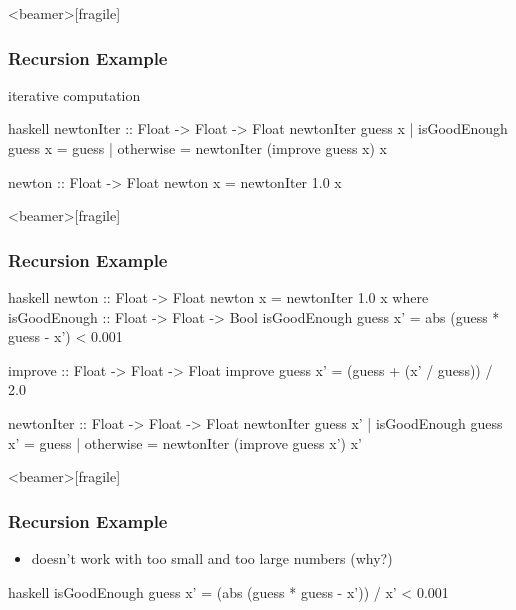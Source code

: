 \documentclass[dvipsnames]{beamer}
\theoremstyle{plain}
\begin{document}
\begin{frame}<beamer>[fragile]
  \frametitle{Recursion Example}

  \begin{exampleblock}{iterative computation}
    \begin{pygments}{haskell}
newtonIter :: Float -> Float -> Float
newtonIter guess x
  | isGoodEnough guess x = guess
  | otherwise            =
        newtonIter (improve guess x) x

newton :: Float -> Float
newton x = newtonIter 1.0 x
    \end{pygments}
  \end{exampleblock}
\end{frame}

\begin{frame}<beamer>[fragile]
  \frametitle{Recursion Example}

  \begin{exampleblock}{}
    \begin{pygments}{haskell}
newton :: Float -> Float
newton x = newtonIter 1.0 x
  where
    isGoodEnough :: Float -> Float -> Bool
    isGoodEnough guess x' =
        abs (guess * guess - x') < 0.001

    improve :: Float -> Float -> Float
    improve guess x' = (guess + (x' / guess)) / 2.0

    newtonIter :: Float -> Float -> Float
    newtonIter guess x'
      | isGoodEnough guess x' = guess
      | otherwise             =
          newtonIter (improve guess x') x'
    \end{pygments}
  \end{exampleblock}
\end{frame}

\begin{frame}<beamer>[fragile]
  \frametitle{Recursion Example}

  \begin{exampleblock}{}
    \begin{itemize}
      \item doesn't work with too small and too large numbers (why?)
    \end{itemize}

    \pause
    \smallskip
    \begin{pygments}{haskell}
isGoodEnough guess x' =
    (abs (guess * guess - x')) / x' < 0.001
    \end{pygments}
  \end{exampleblock}
\end{frame}
\end{document}
